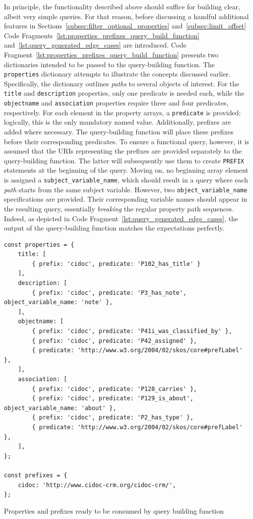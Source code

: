 In principle, the functionality described above should suffice for building clear, albeit very simple queries. For that reason, before discussing a handful additional features in Sections~\ref{subsec:filter_optional_properties} and~\ref{subsec:limit_offset} Code Fragments~\ref{lst:properties_prefixes_query_build_function} and~\ref{lst:query_generated_edge_cases} are introduced. Code Fragment~\ref{lst:properties_prefixes_query_build_function} presents two dictionaries intended to be passed to the query-building function. The \texttt{properties} dictionary attempts to illustrate the concepts discussed earlier. Specifically, the dictionary outlines \textit{paths} to several objects of interest. For the \texttt{title} and \texttt{description} properties, only one predicate is needed each, while the \texttt{objectname} and \texttt{association} properties require three and four predicates, respectively. For each element in the property arrays, a \texttt{predicate} is provided; logically, this is the only mandatory named value. Additionally, prefixes are added where necessary. The query-building function will place these prefixes before their corresponding predicates. To ensure a functional query, however, it is assumed that the URIs representing the prefixes are provided separately to the query-building function. The latter will subsequently use them to create \texttt{PREFIX} statements at the beginning of the query. Moving on, no beginning array element is assigned a \texttt{subject_variable_name}, which should result in a query where each \textit{path} starts from the same subject variable. However, two \texttt{object_variable_name} specifications are provided. Their corresponding variable names should appear in the resulting query, essentially \textit{breaking} the regular property path sequences. Indeed, as depicted in Code Fragment~\ref{lst:query_generated_edge_cases}, the output of the query-building function matches the expectations perfectly.

\begin{listing}[htbp]
    \begin{verbatim}
const properties = {
    title: [
        { prefix: 'cidoc', predicate: 'P102_has_title' }
    ],
    description: [
        { prefix: 'cidoc', predicate: 'P3_has_note', object_variable_name: 'note' },
    ],
    objectname: [
        { prefix: 'cidoc', predicate: 'P41i_was_classified_by' },
        { prefix: 'cidoc', predicate: 'P42_assigned' },
        { predicate: 'http://www.w3.org/2004/02/skos/core#prefLabel' },
    ],
    association: [
        { prefix: 'cidoc', predicate: 'P128_carries' },
        { prefix: 'cidoc', predicate: 'P129_is_about', object_variable_name: 'about' },
        { prefix: 'cidoc', predicate: 'P2_has_type' },
        { predicate: 'http://www.w3.org/2004/02/skos/core#prefLabel' },
    ],
};

const prefixes = {
    cidoc: 'http://www.cidoc-crm.org/cidoc-crm/',
};
    \end{verbatim}
    \caption{Properties and prefixes ready to be consumed by query building function}
    \label{lst:properties_prefixes_query_build_function}
\end{listing}

